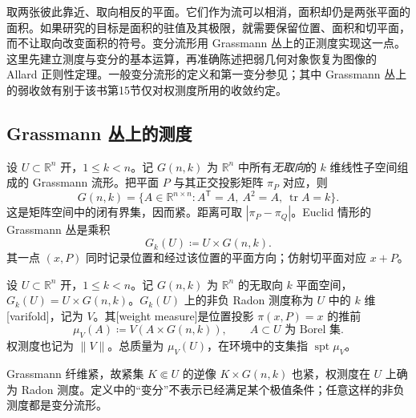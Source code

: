 
% 
% 
% 


取两张彼此靠近、取向相反的平面。它们作为流可以相消，面积却仍是两张平面的面积。如果研究的目标是面积的驻值及其极限，就需要保留位置、面积和切平面，而不让取向改变面积的符号。变分流形用 Grassmann 丛上的正测度实现这一点。这里先建立测度与变分的基本运算，再准确陈述把弱几何对象恢复为图像的 Allard 正则性定理。一般变分流形的定义和第一变分参见\cite[第38--39节，第227--235页]{Simon1983}；其中 Grassmann 丛上的弱收敛有别于该书第15节仅对权测度所用的收敛约定。

\subsection{Grassmann 丛上的测度}
\label{g3:subsec:2304:01}
设 \(U\subset\mathbb R^n\) 开，\(1\le k<n\)。记 \(G(n,k)\) 为 \(\mathbb R^n\) 中所有\emph{无取向}的 \(k\) 维线性子空间组成的 Grassmann 流形。把平面 \(P\) 与其正交投影矩阵 \(\pi_P\) 对应，则
\[
	G(n,k)=\{A\in\mathbb R^{n\times n}:A^{\mathsf T}=A,\ A^2=A,\ \operatorname{tr}A=k\}.
\]
这是矩阵空间中的闭有界集，因而紧。距离可取 \(|\pi_P-\pi_Q|\)。Euclid 情形的 Grassmann 丛是乘积
\[
	G_k(U)\coloneqq U\times G(n,k).
\]
其一点 \((x,P)\) 同时记录位置和经过该位置的平面方向；仿射切平面对应 \(x+P\)。

\begin{definition}\label{g3:def:varifold}
	设 \(U\subset\mathbb R^n\) 开，\(1\le k<n\)。记 \(G(n,k)\) 为 \(\mathbb R^n\) 的无取向 \(k\) 平面空间，\(G_k(U)=U\times G(n,k)\)。\(G_k(U)\) 上的非负 Radon 测度称为 \(U\) 中的 \(k\) 维[varifold]，记为 \(V\)。其[weight measure]是位置投影 \(\pi(x,P)=x\) 的推前
	\[
		\mu_V(A)\coloneqq V(A\times G(n,k)),\qquad A\subset U\text{ 为 Borel 集}.
	\]
	权测度也记为 \(\|V\|\)。总质量为 \(\mu_V(U)\)，在环境中的支集指 \(\operatorname{spt}\mu_V\)。
\end{definition}

Grassmann 纤维紧，故紧集 \(K\Subset U\) 的逆像 \(K\times G(n,k)\) 也紧，权测度在 \(U\) 上确为 Radon 测度。定义中的“变分”不表示已经满足某个极值条件；任意这样的非负测度都是变分流形。

